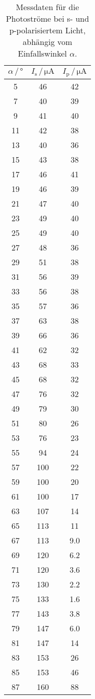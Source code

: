 \begin{table} [H]
    \centering
    \caption{Messdaten für die Photoströme bei s- und p-polarisiertem Licht, abhängig vom Einfallswinkel $\alpha$.}
    \label{tab:daten}
    \begin{tabular}{c | c c}
      \toprule
      {$\alpha\,/\,\unit{\degree}$} & {$I_{\text{s}}\,/\,\unit{\micro\ampere}$} & {$I_{\text{p}}\,/\,\unit{\micro\ampere}$}\\
      \midrule
      5  & 46  & 42 \\
      7  & 40  & 39 \\
      9  & 41  & 40 \\
      11 & 42  & 38 \\
      13 & 40  & 36 \\
      15 & 43  & 38 \\
      17 & 46  & 41 \\
      19 & 46  & 39 \\
      21 & 47  & 40 \\
      23 & 49  & 40 \\
      25 & 49  & 40 \\
      27 & 48  & 36 \\
      29 & 51  & 38 \\
      31 & 56  & 39 \\
      33 & 56  & 38 \\
      35 & 57  & 36 \\
      37 & 63  & 38 \\
      39 & 66  & 36 \\
      41 & 62  & 32 \\
      43 & 68  & 33 \\
      45 & 68  & 32 \\
      47 & 76  & 32 \\
      49 & 79  & 30 \\
      51 & 80  & 26 \\
      53 & 76  & 23 \\
      55 & 94  & 24 \\
      57 & 100 & 22 \\
      59 & 100 & 20 \\
      61 & 100 & 17 \\
      63 & 107 & 14 \\
      65 & 113 & 11 \\
      67 & 113 & 9.0\\
      69 & 120 & 6.2\\
      71 & 120 & 3.6\\
      73 & 130 & 2.2\\
      75 & 133 & 1.6\\
      77 & 143 & 3.8\\
      79 & 147 & 6.0\\
      81 & 147 & 14 \\
      83 & 153 & 26 \\
      85 & 153 & 46 \\
      87 & 160 & 88 \\
      \bottomrule
    \end{tabular}
\end{table}

